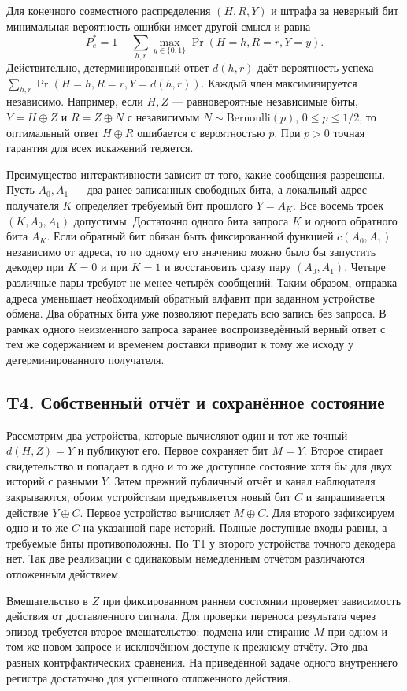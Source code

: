 Для конечного совместного распределения $(H,R,Y)$ и штрафа за неверный бит
минимальная вероятность ошибки имеет другой смысл и равна
\[
 P_e^*=1-\sum_{h,r}\max_{y\in\{0,1\}}\Pr(H=h,R=r,Y=y).
\]
Действительно, детерминированный ответ $d(h,r)$ даёт вероятность успеха
$\sum_{h,r}\Pr(H=h,R=r,Y=d(h,r))$. Каждый член максимизируется независимо.
Например, если $H,Z$ --- равновероятные независимые биты,
$Y=H\oplus Z$ и $R=Z\oplus N$ с независимым $N\sim\mathrm{Bernoulli}(p)$,
$0\le p\le 1/2$, то оптимальный ответ $H\oplus R$ ошибается с вероятностью
$p$. При $p>0$ точная гарантия для всех искажений теряется.

Преимущество интерактивности зависит от того, какие сообщения разрешены.
Пусть $A_0,A_1$ --- два ранее записанных свободных бита, а локальный адрес
получателя $K$ определяет требуемый бит прошлого $Y=A_K$. Все восемь троек
$(K,A_0,A_1)$ допустимы. Достаточно одного бита запроса $K$ и одного
обратного бита $A_K$. Если обратный бит обязан быть фиксированной функцией
$c(A_0,A_1)$ независимо от адреса, то по одному его значению можно было бы
запустить декодер при $K=0$ и при $K=1$ и восстановить сразу пару
$(A_0,A_1)$. Четыре различные пары требуют не менее четырёх сообщений.
Таким образом, отправка адреса уменьшает необходимый обратный алфавит при
заданном устройстве обмена. Два обратных бита уже позволяют передать всю
запись без запроса. В рамках одного неизменного запроса заранее
воспроизведённый верный ответ с тем же содержанием и временем доставки
приводит к тому же исходу у детерминированного получателя.

\subsection{T4. Собственный отчёт и сохранённое состояние}
\label{thm:observer-t4}

Рассмотрим два устройства, которые вычисляют один и тот же точный
$d(H,Z)=Y$ и публикуют его. Первое сохраняет бит $M=Y$. Второе стирает
свидетельство и попадает в одно и то же доступное состояние хотя бы для
двух историй с разными $Y$. Затем прежний публичный отчёт и канал наблюдателя
закрываются, обоим устройствам предъявляется новый бит $C$ и запрашивается
действие $Y\oplus C$. Первое устройство вычисляет $M\oplus C$. Для второго
зафиксируем одно и то же $C$ на указанной паре историй. Полные доступные
входы равны, а требуемые биты противоположны. По T1 у второго устройства
точного декодера нет. Так две реализации с одинаковым немедленным отчётом
различаются отложенным действием.

Вмешательство в $Z$ при фиксированном раннем состоянии проверяет зависимость
действия от доставленного сигнала. Для проверки переноса результата через
эпизод требуется второе вмешательство: подмена или стирание $M$ при одном
и том же новом запросе и исключённом доступе к прежнему отчёту. Это два
разных контрфактических сравнения. На приведённой задаче одного внутреннего
регистра достаточно для успешного отложенного действия.
